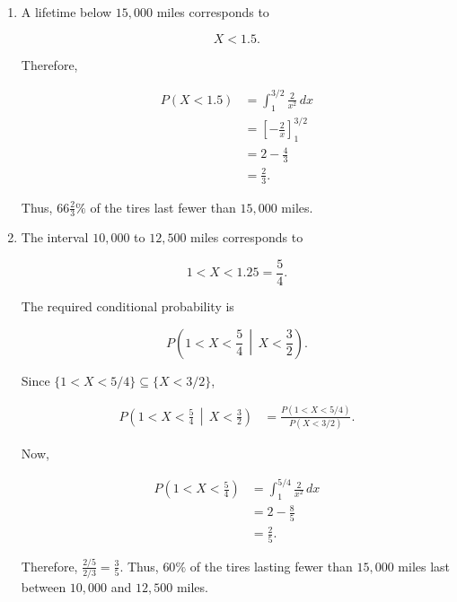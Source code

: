 \documentclass[11pt]{article}
\newenvironment{solution}{
    \par
    \begin{tcolorbox}[
        colback=white,
        colframe=uwgold,
        boxrule=0.7pt,
        arc=2mm,
        left=3mm,
        right=3mm,
        top=2mm,
        bottom=2mm,
        breakable,
        before skip=0.5em,
        after skip=1em,
        title=\textbf{Solution},
        coltitle=uwpurple,
        fonttitle=\bfseries
    ]
}{
    \end{tcolorbox}
}
\begin{document}
\begin{solution}

\begin{enumerate}[label=(\alph*)]

\item A lifetime below \(15{,}000\) miles corresponds to

\[
X<1.5.
\]

Therefore,

\begin{align*}
P(X<1.5)
&=
\int_1^{3/2}\frac{2}{x^2}\,dx\\
&=
\left[-\frac2x\right]_1^{3/2}\\
&=
2-\frac43\\
&=
\frac23.
\end{align*}

Thus, $ {66\frac23\%}$ of the tires last fewer than \(15{,}000\) miles.

\item The interval \(10{,}000\) to \(12{,}500\) miles corresponds to

\[
1<X<1.25=\frac54.
\]

The required conditional probability is

\[
P\left(
1<X<\frac54
\,\middle|\,
X<\frac32
\right).
\]

Since \(\{1<X<5/4\}\subseteq\{X<3/2\}\),

\begin{align*}
P\left(
1<X<\frac54
\,\middle|\,
X<\frac32
\right)
&=
\frac{
P(1<X<5/4)
}{
P(X<3/2)
}.
\end{align*}

Now,

\begin{align*}
P\left(1<X<\frac54\right)
&=
\int_1^{5/4}\frac2{x^2}\,dx\\
&=
2-\frac{8}{5}\\
&=
\frac25.
\end{align*}

Therefore, $\frac{2/5}{2/3}
=
\frac35.$ Thus, $ {60\%}$ of the tires lasting fewer than \(15{,}000\) miles last between
\(10{,}000\) and \(12{,}500\) miles.

\end{enumerate}

\end{solution}
 


\end{document}
